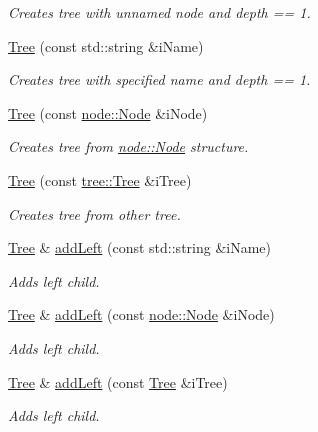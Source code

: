 \begin{DoxyCompactItemize}
\begin{DoxyCompactList}\small\item\em Creates tree with unnamed node and depth == 1. \end{DoxyCompactList}\item 
\hyperlink{classtree_1_1Tree_ac9e85c2936a0c63f4928ac9864e487fb}{Tree} (const std\-::string \&i\-Name)
\begin{DoxyCompactList}\small\item\em Creates tree with specified name and depth == 1. \end{DoxyCompactList}\item 
\hyperlink{classtree_1_1Tree_ad55803fa67e5cd1f1f8b7b80e014ffaa}{Tree} (const \hyperlink{classnode_1_1Node}{node\-::\-Node} \&i\-Node)
\begin{DoxyCompactList}\small\item\em Creates tree from \hyperlink{classnode_1_1Node}{node\-::\-Node} structure. \end{DoxyCompactList}\item 
\hyperlink{classtree_1_1Tree_a71b78c230e92b439dfaab0fe4c9c956c}{Tree} (const \hyperlink{classtree_1_1Tree}{tree\-::\-Tree} \&i\-Tree)
\begin{DoxyCompactList}\small\item\em Creates tree from other tree. \end{DoxyCompactList}\item 
\hyperlink{classtree_1_1Tree}{Tree} \& \hyperlink{classtree_1_1Tree_a73dc8a4574c7222c6640c88eef387a19}{add\-Left} (const std\-::string \&i\-Name)
\begin{DoxyCompactList}\small\item\em Adds left child. \end{DoxyCompactList}\item 
\hyperlink{classtree_1_1Tree}{Tree} \& \hyperlink{classtree_1_1Tree_a6d98f5bb78258d03882041c6d6438ab0}{add\-Left} (const \hyperlink{classnode_1_1Node}{node\-::\-Node} \&i\-Node)
\begin{DoxyCompactList}\small\item\em Adds left child. \end{DoxyCompactList}\item 
\hyperlink{classtree_1_1Tree}{Tree} \& \hyperlink{classtree_1_1Tree_a73996a043448192cd9bb52175cd78a0c}{add\-Left} (const \hyperlink{classtree_1_1Tree}{Tree} \&i\-Tree)
\begin{DoxyCompactList}\small\item\em Adds left child. \end{DoxyCompactList}\item 

\end{DoxyCompactItemize}
